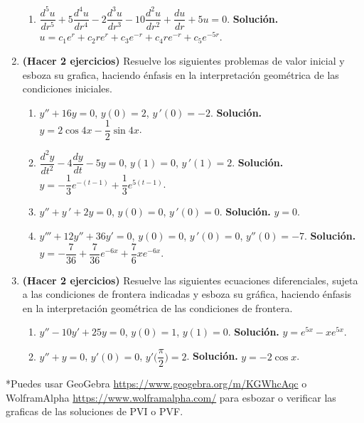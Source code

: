 \documentclass[letterpaper,10pt]{memoir}
\begin{document}
\begin{enumerate}
\begin{enumerate}
			\item \(\dfrac{d^5u}{dr^5} +5 \dfrac{d^4 u}{dr^4} -2 \dfrac{d^3u}{dr^3} -10 \dfrac{d^2u}{dr^2} + \dfrac{du}{dr} +5u=0\). \textbf{Solución.} \(u=c_1e^r+c_2re^r+c_3e^{-r} +c_4re^{-r} +c_5e^{-5r}\).
		\end{enumerate}
	\item \textbf{(Hacer 2 ejercicios)} Resuelve los siguientes problemas de valor inicial y esboza su grafica, haciendo énfasis en la interpretación geométrica de las condiciones iniciales.
		\begin{enumerate}
			\item \(y'' +16y=0\), \(y(0) =2\), \(y \,' (0) =-2\). \textbf{Solución.} \(y=2 \cos 4x- \dfrac{1}{2} \sin 4x\).
			\item \(\dfrac{d^2y}{dt^2} -4 \dfrac{dy}{dt} -5y=0\), \(y(1) =0\), \(y \,' (1) =2\). \textbf{Solución.} \(y=- \dfrac{1}{3} e^{-(t-1)} + \dfrac{1}{3} e^{5(t-1)}\).
			\item \(y'' +y \,' +2y=0\), \(y(0) =0\), \(y \,' (0) =0\). \textbf{Solución.} \(y=0\).
			\item \(y''' +12y'' +36y' =0\), \(y(0) =0\), \(y \,' (0) =0\), \(y'' (0) =-7\). \textbf{Solución.} \(y=- \dfrac{7}{36} + \dfrac{7}{36} e^{-6x} + \dfrac{7}{6} xe^{-6x}\).
		\end{enumerate}
	\item \textbf{(Hacer 2 ejercicios)} Resuelve las siguientes ecuaciones diferenciales, sujeta a las condiciones de frontera indicadas y esboza su gráfica, haciendo énfasis en la interpretación geométrica de las condiciones de frontera.
		\begin{enumerate}
			\item \(y'' -10y' +25y=0\), \(y(0) =1\), \(y(1) =0\). \textbf{Solución.} \(y=e^{5x} -xe^{5x}\).
			\item \(y'' +y=0\), \(y' (0) =0\), \(y' \Bigg(\dfrac{\pi}{2}\Bigg) =2\). \textbf{Solución.} \(y=-2 \cos x\).
		\end{enumerate}
\end{enumerate}
*Puedes usar GeoGebra \url{https://www.geogebra.org/m/KGWhcAqc} o WolframAlpha \url{https://www.wolframalpha.com/} para esbozar o verificar las graficas de las soluciones de PVI o PVF.
\end{document}

